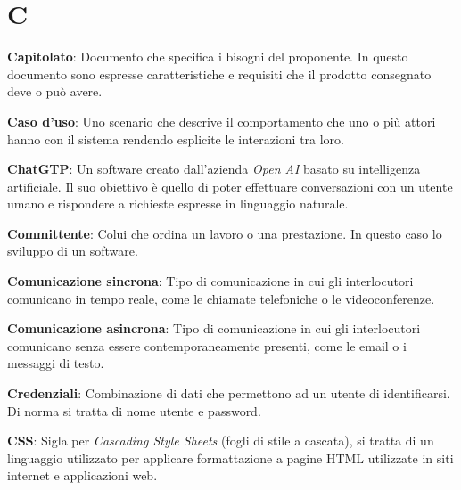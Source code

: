 \documentclass[5pt]{article}
\begin{document}
\section*{C}
\begin{flushleft}

\textbf{Capitolato}: Documento che specifica i bisogni del proponente. In questo documento sono espresse caratteristiche e requisiti che il prodotto consegnato deve o può avere.\newline

\textbf{Caso d'uso}: Uno scenario che descrive il comportamento che uno o più attori hanno con il sistema rendendo esplicite le interazioni tra loro.\newline

\textbf{ChatGTP}: Un software creato dall'azienda \textit{Open AI} basato su intelligenza artificiale. Il suo obiettivo è quello di poter effettuare conversazioni con un utente umano e rispondere a richieste espresse in linguaggio naturale.\newline

\textbf{Committente}: Colui che ordina un lavoro o una prestazione. In questo caso lo sviluppo di un software.\newline

\textbf{Comunicazione sincrona}: Tipo di comunicazione in cui gli interlocutori comunicano in tempo reale, come le chiamate telefoniche o le videoconferenze.\newline

\textbf{Comunicazione asincrona}: Tipo di comunicazione in cui gli interlocutori comunicano senza essere contemporaneamente presenti, come le email o i messaggi di testo.\newline

\textbf{Credenziali}: Combinazione di dati che permettono ad un utente di identificarsi. Di norma si tratta di nome utente e password.\newline

\textbf{CSS}: Sigla per \textit{Cascading Style Sheets} (fogli di stile a cascata), si tratta di un linguaggio utilizzato per applicare formattazione a pagine HTML utilizzate in siti internet e applicazioni web.\\

\end{flushleft}
\end{document}
